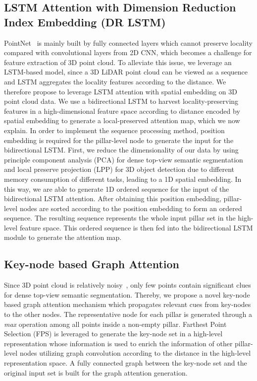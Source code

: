 \documentclass[lettersize,journal]{IEEEtran}
\begin{document}
\subsection{LSTM Attention with Dimension Reduction Index Embedding (DR LSTM)}
PointNet~\cite{pointnet} is mainly built by fully connected layers which cannot preserve locality compared with convolutional layers from 2D CNN, which becomes a challenge for feature extraction of 3D point cloud. 
To alleviate this issue, we leverage an LSTM-based model, since a 3D LiDAR point cloud can be viewed as a sequence and LSTM aggregates the locality features according to the distance.
We therefore propose to leverage LSTM attention with spatial embedding on 3D point cloud data.
We use a bidirectional LSTM to harvest locality-preserving features in a high-dimensional feature space according to distance encoded by spatial embedding to generate a local-preserved attention map, which we now explain. 
In order to implement the sequence processing method, position embedding is required for the pillar-level node to generate the input for the bidirectional LSTM. 
First, we reduce the dimensionality of our data by using principle component analysis (PCA) for dense top-view semantic segmentation and local preserve projection (LPP) for 3D object detection due to different memory consumption of different tasks, leading to a 1D spatial embedding.
In this way, we are able to generate 1D ordered sequence for the input of the bidirectional LSTM attention. 
After obtaining this position embedding, pillar-level nodes are sorted according to the position embedding to form an ordered sequence. The resulting sequence represents the whole input pillar set in the high-level feature space. This ordered sequence is then fed into the bidirectional LSTM module to generate the attention map. 
\subsection{Key-node based Graph Attention}
Since 3D point cloud is relatively noisy~\cite{han2017review}, only few points contain significant clues for dense top-view semantic segmentation. Thereby, we propose a novel key-node based graph attention mechanism which propagates relevant cues from key-nodes to the other nodes. The representative node for each pillar is generated through a \emph{max} operation among all points inside a non-empty pillar. Farthest Point Selection (FPS) is leveraged to generate the key-node set in a high-level representation whose information is used to enrich the information of other pillar-level nodes utilizing graph convolution according to the distance in the high-level representation space. A fully connected graph between the key-node set and the original input set is built for the graph attention generation. 
\end{document}
